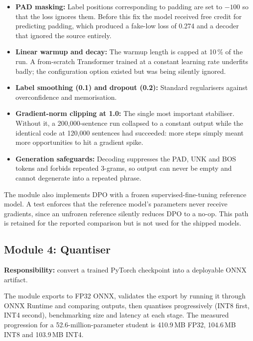 \begin{itemize}
  \item \textbf{PAD masking:} Label positions corresponding to padding are set
        to $-100$ so that the loss ignores them. Before this fix the model
        received free credit for predicting padding, which produced a
        fake-low loss of 0.274 and a decoder that ignored the source entirely.
  \item \textbf{Linear warmup and decay:} The warmup length is capped at
        10\,\% of the run. A from-scratch Transformer trained at a constant
        learning rate underfits badly; the configuration option existed but was
        being silently ignored.
  \item \textbf{Label smoothing (0.1) and dropout (0.2):} Standard regularisers
        against overconfidence and memorisation.
  \item \textbf{Gradient-norm clipping at 1.0:} The single most important
        stabiliser. Without it, a 200{,}000-sentence run collapsed to a constant
        output while the identical code at 120{,}000 sentences had succeeded: more steps simply meant more opportunities to hit a gradient spike.
  \item \textbf{Generation safeguards:} Decoding suppresses the PAD, UNK and BOS
        tokens and forbids repeated 3-grams, so output can never be empty and
        cannot degenerate into a repeated phrase.
\end{itemize}

The module also implements DPO with a frozen supervised-fine-tuning reference
model. A test enforces that the reference model's parameters never receive
gradients, since an unfrozen reference silently reduces DPO to a no-op. This
path is retained for the reported comparison but is not used for the shipped
models.

\subsection{Module 4: Quantiser}
\label{subsec:mod4}

\textbf{Responsibility:} convert a trained PyTorch checkpoint into a deployable
ONNX artifact.

The module exports to FP32 ONNX, validates the export by running it through ONNX
Runtime and comparing outputs, then quantises progressively (INT8 first, INT4
second), benchmarking size and latency at each stage. The measured progression
for a 52.6-million-parameter student is 410.9\,MB FP32, 104.6\,MB INT8 and
103.9\,MB INT4.

